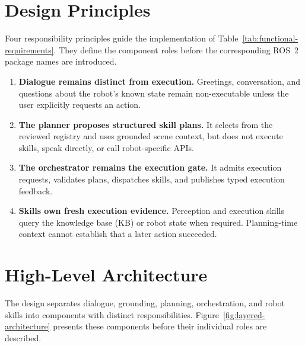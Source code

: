 \section{Design Principles}

Four responsibility principles guide the implementation of Table~\ref{tab:functional-requirements}. They define the component roles before the corresponding ROS~2 package names are introduced.

\begin{enumerate}
  \item \textbf{Dialogue remains distinct from execution.} Greetings, conversation, and questions about the robot's known state remain non-executable unless the user explicitly requests an action.
  \item \textbf{The planner proposes structured skill plans.} It selects from the reviewed registry and uses grounded scene context, but does not execute skills, speak directly, or call robot-specific APIs.
  \item \textbf{The orchestrator remains the execution gate.} It admits execution requests, validates plans, dispatches skills, and publishes typed execution feedback.
  \item \textbf{Skills own fresh execution evidence.} Perception and execution skills query the knowledge base (KB) or robot state when required. Planning-time context cannot establish that a later action succeeded.
\end{enumerate}

\section{High-Level Architecture}
\label{sec:high-level-ros-architecture}

The design separates dialogue, grounding, planning, orchestration, and robot skills into components with distinct responsibilities. Figure~\ref{fig:layered-architecture} presents these components before their individual roles are described.


